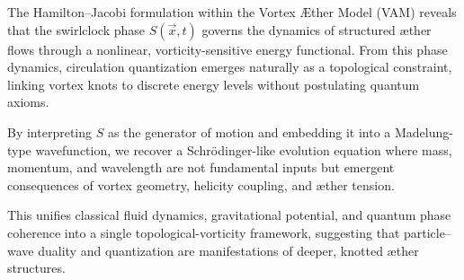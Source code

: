 The Hamilton–Jacobi formulation within the Vortex \AE{}ther Model (VAM) reveals that the swirlclock phase \( S(\vec{x}, t) \) governs the dynamics of structured æther flows through a nonlinear, vorticity-sensitive energy functional. From this phase dynamics, circulation quantization emerges naturally as a topological constraint, linking vortex knots to discrete energy levels without postulating quantum axioms.


By interpreting $S$ as the generator of motion and embedding it into a Madelung-type wavefunction, we recover a Schrödinger-like evolution equation where mass, momentum, and wavelength are not fundamental inputs but emergent consequences of vortex geometry, helicity coupling, and æther tension.


This unifies classical fluid dynamics, gravitational potential, and quantum phase coherence into a single topological-vorticity framework, suggesting that particle–wave duality and quantization are manifestations of deeper, knotted æther structures.


